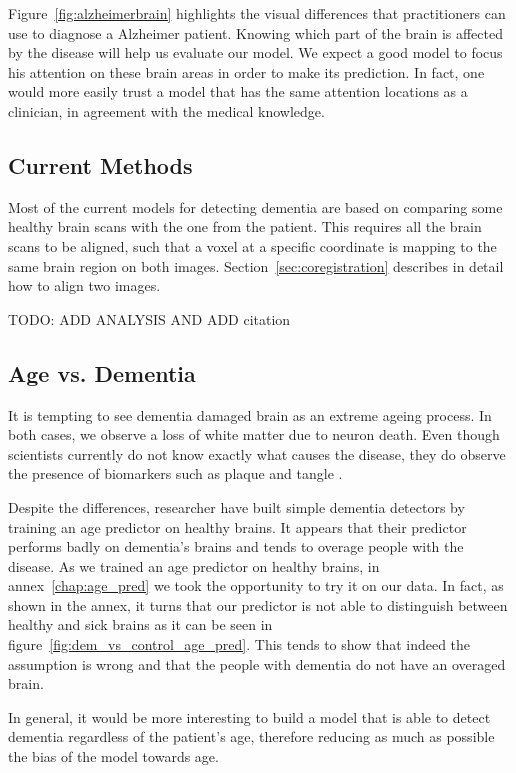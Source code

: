 Figure~\ref{fig:alzheimerbrain} highlights the visual differences that practitioners can use to diagnose a Alzheimer patient. Knowing which part of the brain is affected by the disease will help us evaluate our model. We expect a good model to focus his attention on these brain areas in order to make its prediction. In fact, one would more easily trust a model that has the same attention locations as a clinician, in agreement with the medical knowledge.

\subsection{Current Methods}
Most of the current models for detecting dementia are based on comparing some healthy brain scans with the one from the patient. This requires all the brain scans to be aligned, such that a voxel at a specific coordinate is mapping to the same brain region on both images. Section~\ref{sec:coregistration} describes in detail how to align two images.

TODO: ADD ANALYSIS AND ADD citation


\subsection{Age vs. Dementia}

It is tempting to see dementia damaged brain as an extreme ageing process. In both cases, we observe a loss of white matter due to neuron death. Even though scientists currently do not know exactly what causes the disease, they do observe the presence of biomarkers such as plaque and tangle \cite{alzheimer_past_present_future}.

Despite the differences, researcher\cite{brain_age_10.3389/fneur.2019.00789} have built simple dementia detectors by training an age predictor on healthy brains. It appears that their predictor performs badly on dementia's brains and tends to overage people with the disease. As we trained an age predictor on healthy brains, in annex~\ref{chap:age_pred} we took the opportunity to try it on our data. In fact, as shown in the annex, it turns that our predictor is not able to distinguish between healthy and sick brains as it can be seen in figure~\ref{fig:dem_vs_control_age_pred}. This tends to show that indeed the assumption is wrong and that the people with dementia do not have an overaged brain.

In general, it would be more interesting to build a model that is able to detect dementia regardless of the patient's age, therefore reducing as much as possible the bias of the model towards age.


